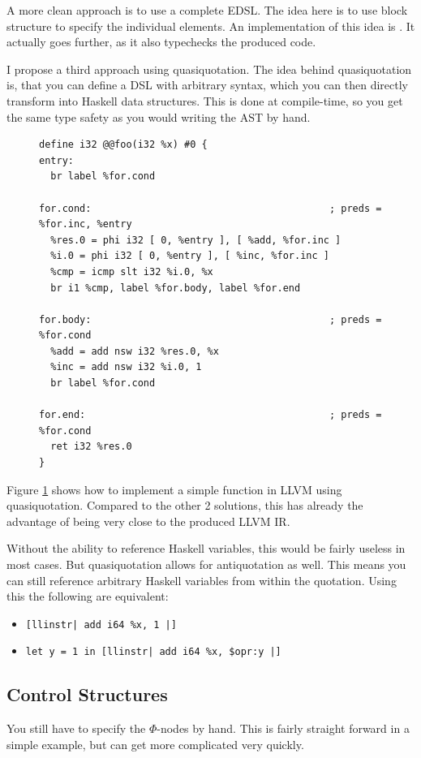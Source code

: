 \documentclass[a4paper,bibliography=totocnumbered,parskip,headsepline]{scrbook}
\begin{document}
A more clean approach is to use a complete EDSL.
The idea here is to use block structure to specify the individual elements.
An implementation of this idea is .
It actually goes further, as it also typechecks the produced code.

I propose a third approach using quasiquotation\cite{mainland2007quote}.
The idea behind quasiquotation is, that you can define a DSL with arbitrary syntax, which you can then directly transform into Haskell data structures.
This is done at compile-time, so you get the same type safety as you would writing the AST by hand.

\begin{figure}
\begin{lstlisting}
define i32 @@foo(i32 %x) #0 {
entry:
  br label %for.cond

for.cond:                                         ; preds = %for.inc, %entry
  %res.0 = phi i32 [ 0, %entry ], [ %add, %for.inc ]
  %i.0 = phi i32 [ 0, %entry ], [ %inc, %for.inc ]
  %cmp = icmp slt i32 %i.0, %x
  br i1 %cmp, label %for.body, label %for.end

for.body:                                         ; preds = %for.cond
  %add = add nsw i32 %res.0, %x
  %inc = add nsw i32 %i.0, 1
  br label %for.cond

for.end:                                          ; preds = %for.cond
  ret i32 %res.0
}
\end{lstlisting}
\label{fig:simplequote}
\end{figure}

Figure \ref{fig:simplequote} shows how to implement a simple function in LLVM using quasiquotation.
Compared to the other 2 solutions, this has already the advantage of being very close to the produced LLVM IR.

Without the ability to reference Haskell variables, this would be fairly useless in most cases.
But quasiquotation allows for antiquotation as well.
This means you can still reference arbitrary Haskell variables from within the quotation.
Using this the following are equivalent:
\begin{itemize}
 \item \lstinline{[llinstr| add i64 %x, 1 |]}
 \item \lstinline{let y = 1 in [llinstr| add i64 %x, $opr:y |]}
\end{itemize}

\subsection{Control Structures}
You still have to specify the $\Phi$-nodes by hand.
This is fairly straight forward in a simple example, but can get more complicated very quickly.
\end{document}
